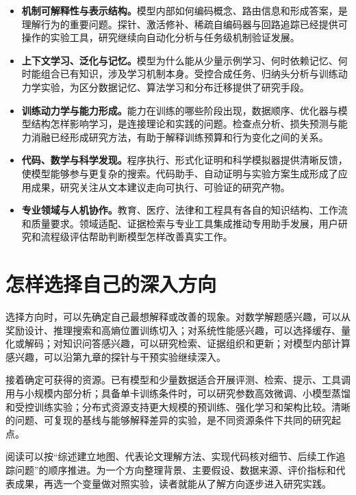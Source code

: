 \begin{itemize}
    \item \textbf{机制可解释性与表示结构。}模型内部如何编码概念、路由信息和形成答案，是理解行为的重要问题。探针、激活修补、稀疏自编码器与回路追踪已经提供可操作的实验工具，研究继续向自动化分析与任务级机制验证发展。
    \item \textbf{上下文学习、泛化与记忆。}模型为什么能从少量示例学习、何时依赖记忆、何时能组合已有知识，涉及学习机制本身。受控合成任务、归纳头分析与训练动力学实验，为区分数据记忆、算法学习和分布迁移提供了研究手段。
    \item \textbf{训练动力学与能力形成。}能力在训练的哪些阶段出现，数据顺序、优化器与模型结构怎样影响学习，是连接理论和实践的问题。检查点分析、损失预测与能力消融已经形成研究方法，有助于解释训练预算和行为变化之间的关系。
    \item \textbf{代码、数学与科学发现。}程序执行、形式化证明和科学模拟器提供清晰反馈，使模型能够参与更复杂的搜索。代码助手、自动证明与实验方案生成形成了应用成果，研究关注从文本建议走向可执行、可验证的研究产物。
    \item \textbf{专业领域与人机协作。}教育、医疗、法律和工程具有各自的知识结构、工作流和质量要求。领域适配、证据检索与专业工具集成推动专用助手发展，用户研究和流程级评估帮助判断模型怎样改善真实工作。
\end{itemize}

\section{怎样选择自己的深入方向}

选择方向时，可以先确定自己最想解释或改善的现象。对数学解题感兴趣，可以从奖励设计、推理搜索和高熵位置训练切入；对系统性能感兴趣，可以选择缓存、量化或解码；对知识问答感兴趣，可以研究检索、证据组织和更新；对模型内部计算感兴趣，可以沿第九章的探针与干预实验继续深入。

接着确定可获得的资源。已有模型和少量数据适合开展评测、检索、提示、工具调用与小规模内部分析；具备单卡训练条件时，可以研究参数高效微调、小模型蒸馏和受控训练实验；分布式资源支持更大规模的预训练、强化学习和架构比较。清晰的问题、可复现的基线与能够解释差异的实验，是不同资源条件下共同的研究起点。

阅读可以按``综述建立地图、代表论文理解方法、实现代码核对细节、后续工作追踪问题''的顺序推进。为一个方向整理背景、主要假设、数据来源、评价指标和代表成果，再选一个变量做对照实验，读者就能从了解方向逐步进入研究实践。

